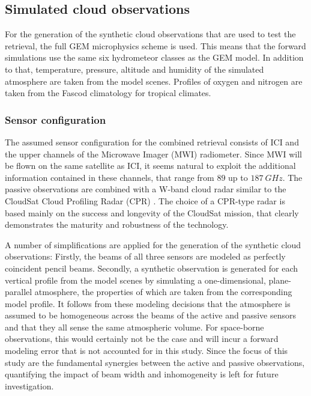 \documentclass[journal abbreviation, manuscript]{copernicus}
\begin{document}
\subsection{Simulated cloud observations}

For the generation of the synthetic cloud observations that are used to test the
retrieval, the full GEM microphysics scheme is used. This means that the forward
simulations use the same six hydrometeor classes as the GEM model. In addition to
that, temperature, pressure, altitude and humidity of the simulated atmosphere
are taken from the model scenes. Profiles of oxygen and nitrogen are taken from
the Fascod climatology for tropical climates.

\subsubsection{Sensor configuration}
\label{sec:sensors}

The assumed sensor configuration for the combined retrieval consists of ICI and
the upper channels of the Microwave Imager (MWI) radiometer. Since MWI will be
flown on the same satellite as ICI, it seems natural to exploit the additional
information contained in these channels, that range from $89$ up to
$187\ \unit{GHz}$. The passive observations are combined with a W-band cloud
radar similar to the CloudSat Cloud Profiling Radar (CPR)
\citep{stephens02,tanelli08}. The choice of a CPR-type radar is based mainly on
the success and longevity of the CloudSat mission, that clearly demonstrates the
maturity and robustness of the technology.

A number of simplifications are applied for the generation of the synthetic
cloud observations: Firstly, the beams of all three sensors are modeled as
perfectly coincident pencil beams. Secondly, a synthetic observation is
generated for each vertical profile from the model scenes by simulating a
one-dimensional, plane-parallel atmosphere, the properties of which are taken
from the corresponding model profile. It follows from these modeling decisions
that the atmosphere is assumed to be homogeneous across the beams of the active
and passive sensors and that they all sense the same atmospheric volume. For
space-borne observations, this would certainly not be the case and will incur a
forward modeling error that is not accounted for in this study. Since the
 focus of this study are the fundamental synergies between the active and passive
 observations, quantifying the impact of beam width and inhomogeneity is left
 for future investigation.
\end{document}
